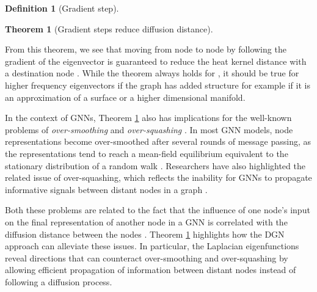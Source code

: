 \documentclass{article} \usepackage{arxiv,times}
\newtheorem{theorem}{Theorem}[section]
\newtheorem{definition}{Definition}
\begin{document}
\begin{definition}[Gradient step]
\label{def:gradient-step}
\end{definition}
\begin{theorem}[Gradient steps reduce diffusion distance]
\label{th:reduced-diffusion-distance}
\end{theorem}
From this theorem, we see that moving from node  to node  by following the gradient of the eigenvector  is guaranteed to reduce the heat kernel distance with a destination node .
While the theorem always holds for , it should be true for higher frequency eigenvectors if the graph has added structure for example if it is an approximation of a surface or a higher dimensional manifold.



In the context of GNNs, Theorem \ref{th:reduced-diffusion-distance} also has implications for the well-known problems of {\em over-smoothing} and {\em over-squashing} \cite{alon_bottleneck_2020, hamilton_2020}. 
In most GNN models, node representations become over-smoothed after several rounds of message passing, as the representations tend to reach a mean-field equilibrium equivalent to the stationary distribution of a random walk \cite{hamilton_2020}. 
Researchers have also highlighted the related issue of over-squashing, which reflects the inability for GNNs to propagate informative signals between distant nodes in a graph \cite{alon_bottleneck_2020}.

Both these problems are related to the fact that the influence of one node's input on the final representation of another node in a GNN is correlated with the diffusion distance between the nodes \cite{xu2018representation}.
Theorem \ref{th:reduced-diffusion-distance} highlights how the DGN approach can alleviate these issues. In particular, the Laplacian eigenfunctions reveal directions that can counteract over-smoothing and over-squashing by allowing efficient propagation of information between distant nodes instead of following a diffusion process. 
\end{document}
